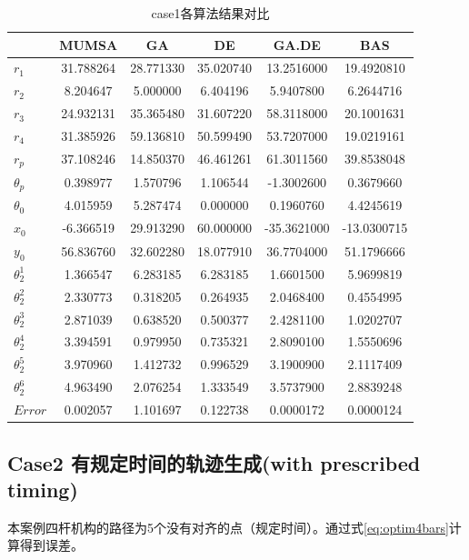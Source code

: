 \documentclass[]{ctexbook}
\begin{document}
\begin{table}[t]

\caption{\label{tab:case1table}case1各算法结果对比}
\centering
\begin{tabular}{lccccc}
\toprule
  & MUMSA & GA & DE & GA.DE & BAS\\
\midrule
$r_1$ & 31.788264 & 28.771330 & 35.020740 & 13.2516000 & 19.4920810\\
$r_2$ & 8.204647 & 5.000000 & 6.404196 & 5.9407800 & 6.2644716\\
$r_3$ & 24.932131 & 35.365480 & 31.607220 & 58.3118000 & 20.1001631\\
$r_4$ & 31.385926 & 59.136810 & 50.599490 & 53.7207000 & 19.0219161\\
$r_p$ & 37.108246 & 14.850370 & 46.461261 & 61.3011560 & 39.8538048\\
\addlinespace
$\theta_p$ & 0.398977 & 1.570796 & 1.106544 & -1.3002600 & 0.3679660\\
$\theta_0$ & 4.015959 & 5.287474 & 0.000000 & 0.1960760 & 4.4245619\\
$x_0$ & -6.366519 & 29.913290 & 60.000000 & -35.3621000 & -13.0300715\\
$y_0$ & 56.836760 & 32.602280 & 18.077910 & 36.7704000 & 51.1796666\\
$\theta_2^1$ & 1.366547 & 6.283185 & 6.283185 & 1.6601500 & 5.9699819\\
\addlinespace
$\theta_2^2$ & 2.330773 & 0.318205 & 0.264935 & 2.0468400 & 0.4554995\\
$\theta_2^3$ & 2.871039 & 0.638520 & 0.500377 & 2.4281100 & 1.0202707\\
$\theta_2^4$ & 3.394591 & 0.979950 & 0.735321 & 2.8090100 & 1.5550696\\
$\theta_2^5$ & 3.970960 & 1.412732 & 0.996529 & 3.1900900 & 2.1117409\\
$\theta_2^6$ & 4.963490 & 2.076254 & 1.333549 & 3.5737900 & 2.8839248\\
\addlinespace
$Error$ & 0.002057 & 1.101697 & 0.122738 & 0.0000172 & 0.0000124\\
\bottomrule
\end{tabular}
\end{table}

\subsection{Case2 有规定时间的轨迹生成(with prescribed
timing)}\label{case2-with-prescribed-timing}

本案例四杆机构的路径为5个没有对齐的点（规定时间）。通过式\eqref{eq:optim4bars}计算得到误差。
\end{document}
